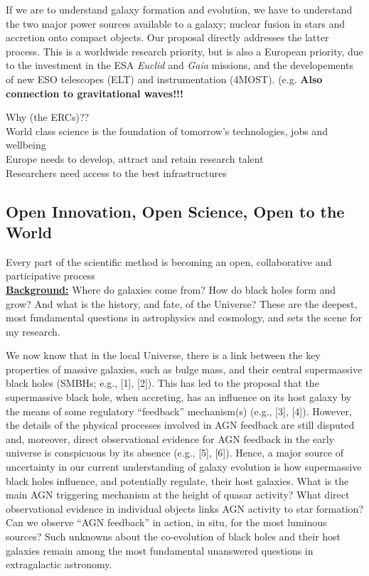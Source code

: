 \documentclass[oneside, a4paper, onecolumn, 11pt]{article}
\begin{document}





\smallskip
\smallskip
\noindent
If we are to understand galaxy formation and evolution, we have to
understand the two major power sources available to a galaxy; nuclear
fusion in stars and accretion onto compact objects. Our proposal
directly addresses the latter process. This is a worldwide research
priority, but is also a European priority, due to the investment in
the ESA {\it Euclid} and {\it Gaia} missions, and the developements of
new ESO telescopes (ELT) and instrumentation (4MOST).  (e.g.
{\bf Also connection to gravitational waves!!!} 



\noindent
Why (the ERCs)??\\
World class science is the foundation of tomorrow’s technologies, jobs and wellbeing\\
Europe needs to develop, attract and retain research talent\\
Researchers need access to the best infrastructures\\


\subsection{Open Innovation, Open Science, Open to the World}
Every part of the scientific method is becoming an open, collaborative and participative process \\





\noindent
{\bf \underline {Background:}}
Where do galaxies come from? How do black holes form and grow? And
what is the history, and fate, of the Universe?  These are the
deepest, most fundamental questions in astrophysics and cosmology, and
sets the scene for my research.

\smallskip 
\smallskip
\noindent
We now know that in the local Universe, there is a link between the
key properties of massive galaxies, such as bulge mass, and their
central supermassive black holes (SMBHs; e.g., [1], [2]). This has led
to the proposal that the supermassive black hole, when accreting, has
an influence on its host galaxy by the means of some regulatory
``feedback'' mechanism(s) (e.g., [3], [4]). However, the details of
the physical processes involved in AGN feedback are still disputed
and, moreover, direct observational evidence for AGN feedback in the
early universe is conspicuous by its absence (e.g., [5], [6]). Hence,
a major source of uncertainty in our current understanding of galaxy
evolution is how supermassive black holes influence, and potentially
regulate, their host galaxies.
What is the main AGN triggering mechanism at the height of quasar
activity? What direct observational evidence in individual objects
links AGN activity to star formation?  Can we observe ``AGN feedback''
in action, in situ, for the most luminous sources?  Such unknowns
about the co-evolution of black holes and their host galaxies remain
among the most fundamental unanswered questions in extragalactic
astronomy.
\end{document}
